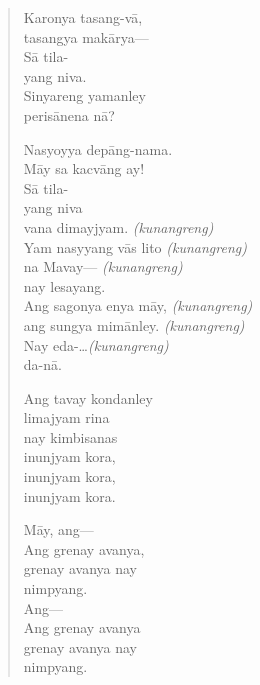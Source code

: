 \documentclass[12pt,paper=a4]{scrartcl}
\begin{document}
\begin{quote}
\begin{multicols}{2}
Karonya tasang-vā,\\
tasangya makārya---\\
Sā tila-\\
yang niva.\\
Sinyareng yamanley\\
perisānena nā?

Nasyoyya depāng-nama.\\
Māy sa kacvāng ay!\\
Sā tila-\\
yang niva\\
vana dimayjyam.			\tab \textit{(kunangreng)}\\
Yam nasyyang vās lito	\tab \textit{(kunangreng)}\\
na Mavay---				\tab \textit{(kunangreng)}\\
nay lesayang.\\
Ang sagonya enya māy,	\tab \textit{(kunangreng)}\\
ang sungya mimānley.	\tab \textit{(kunangreng)}\\
Nay eda-\dots			\tab \textit{(kunangreng)}\\
da-nā.

\columnbreak

Ang tavay kondanley\\
limajyam rina\\
nay kimbisanas\\
inunjyam kora,\\
inunjyam kora,\\
inunjyam kora.

Māy, ang---\\
Ang grenay avanya,\\
grenay avanya nay\\
nimpyang.\\
Ang---\\
Ang grenay avanya\\
grenay avanya nay\\
nimpyang.
\end{multicols}



\end{quote}
\end{document}
